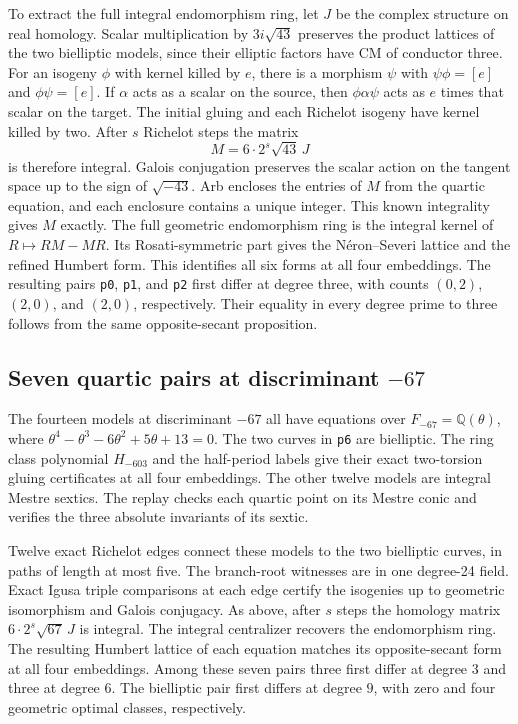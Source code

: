 \documentclass[11pt,letterpaper]{amsart}
\theoremstyle{definition}
\numberwithin{equation}{section}
\newcommand{\Q}{\mathbb Q}
\begin{document}
To extract the full integral endomorphism ring, let \(J\) be the
complex structure on real homology. Scalar multiplication by
\(3i\sqrt{43}\) preserves the product lattices of the two bielliptic
models, since their elliptic factors have CM of conductor three.
For an isogeny \(\phi\) with kernel killed by \(e\), there is a
morphism \(\psi\) with \(\psi\phi=[e]\) and \(\phi\psi=[e]\).
If \(\alpha\) acts as a scalar on the source, then
\(\phi\alpha\psi\) acts as \(e\) times that scalar on the target.
The initial gluing and each Richelot isogeny have kernel killed by
two. After \(s\) Richelot steps the matrix
\[
                  M=6\cdot 2^s\sqrt{43}\,J
\]
is therefore integral. Galois conjugation preserves the scalar
action on the tangent space up to the sign of \(\sqrt{-43}\).
Arb encloses the entries of \(M\) from the quartic equation, and each enclosure contains a unique integer. This known
integrality gives \(M\) exactly. The full geometric endomorphism ring
is the integral kernel of \(R\mapsto RM-MR\). Its Rosati-symmetric
part gives the N\'eron--Severi lattice and the refined Humbert form.
This identifies all six forms at all four embeddings. The resulting
pairs \texttt{p0}, \texttt{p1}, and \texttt{p2} first differ at degree
three, with counts \((0,2)\), \((2,0)\), and \((2,0)\), respectively.
Their equality in every degree prime to three follows from the same
opposite-secant proposition.

\subsection{Seven quartic pairs at discriminant \texorpdfstring{\(-67\)}{-67}}

The fourteen models at discriminant \(-67\) all have equations over
\(F_{-67}=\Q(\theta)\), where
\(\theta^4-\theta^3-6\theta^2+5\theta+13=0\). The two curves in
\texttt{p6} are bielliptic. The ring class polynomial \(H_{-603}\)
and the half-period labels give their exact two-torsion gluing
certificates at all four embeddings. The other twelve models are
integral Mestre sextics. The replay checks each quartic point on its
Mestre conic and verifies the three absolute invariants of its sextic.

Twelve exact Richelot edges connect these models to the two
bielliptic curves, in paths of length at most five. The branch-root
witnesses are in one degree-24 field. Exact Igusa triple comparisons
at each edge certify the isogenies up to geometric isomorphism and
Galois conjugacy. As above, after \(s\) steps the homology matrix
\(6\cdot 2^s\sqrt{67}\,J\) is integral. The integral centralizer
recovers the endomorphism ring. The resulting Humbert lattice of each
equation matches its opposite-secant form at all four embeddings.
Among these seven pairs three first differ at degree \(3\) and three
at degree \(6\). The bielliptic pair first differs at degree \(9\),
with zero and four geometric optimal classes, respectively.
\end{document}
